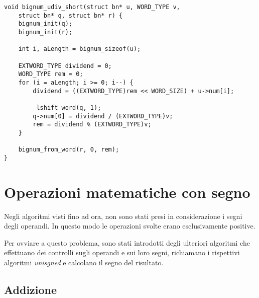 \begin{lstlisting}[basicstyle=\ttfamily\small, backgroundcolor=\color{bgCode}]
void bignum_udiv_short(struct bn* u, WORD_TYPE v,
    struct bn* q, struct bn* r) {
    bignum_init(q);
    bignum_init(r);
    
    int i, aLength = bignum_sizeof(u);
    
    EXTWORD_TYPE dividend = 0;
    WORD_TYPE rem = 0;
    for (i = aLength; i >= 0; i--) {
        dividend = ((EXTWORD_TYPE)rem << WORD_SIZE) + u->num[i];
        
        _lshift_word(q, 1);
        q->num[0] = dividend / (EXTWORD_TYPE)v;
        rem = dividend % (EXTWORD_TYPE)v;
    }
    
    bignum_from_word(r, 0, rem);
}
\end{lstlisting}
\clearpage

%
%
\section{Operazioni matematiche con segno}
%
%

Negli algoritmi visti fino ad ora, non sono stati presi in considerazione i segni degli operandi. In questo modo le operazioni svolte erano esclusivamente positive.

Per ovviare a questo problema, sono stati introdotti degli ulteriori algoritmi che effettuano dei controlli sugli operandi e sui loro segni, richiamano i rispettivi algoritmi \emph{unisgned} e calcolano il segno del risultato.

%
\subsection{Addizione}
%

